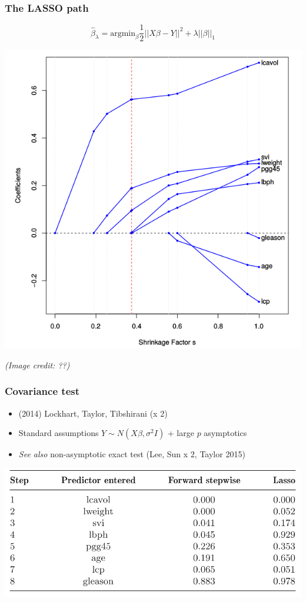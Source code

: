 \documentclass{beamer}
\begin{document}
\begin{frame}
\frametitle{The LASSO path}
\[
\hat{\beta}_\lambda = \text{argmin}_\beta \frac{1}{2}||X\beta - Y||^2 + \lambda ||\beta||_1
\]
\begin{center}
\includegraphics[scale = 0.25]{lasso_path.png}
\end{center}
\emph{(Image credit: ??)}
\end{frame}

\begin{frame}
\frametitle{Covariance test}
\begin{itemize}
\item (2014) Lockhart, Taylor, Tibshirani (x 2)
\item Standard assumptions $Y \sim N(X\beta, \sigma^2 I)$ + large $p$ asymptotics
\item \emph{See also} non-asymptotic exact test (Lee, Sun x 2, Taylor 2015)
\end{itemize}
\begin{center}
\includegraphics[scale = 0.25]{covtest.png}
\end{center}
\end{frame}
\end{document}
